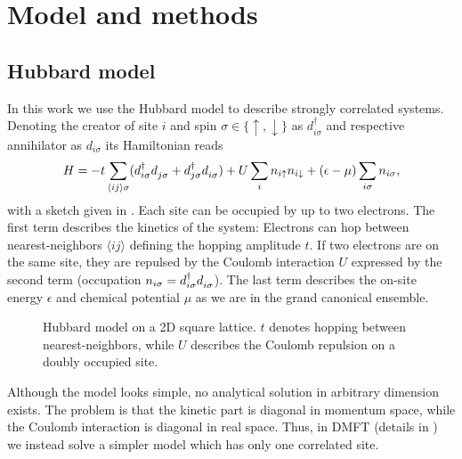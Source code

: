 
\chapter{Model and methods}

\section{Hubbard model}
\label{sec:hubbard-model}

In this work we use the Hubbard model \cite{Hubbard1997} to describe strongly correlated systems.
Denoting the creator of site $i$ and spin $\sigma\in\{\uparrow,\downarrow\}$
as $d^\dag_{i\sigma}$ and respective annihilator as $d_{i\sigma}$ its Hamiltonian reads
\begin{equation}
    H
    =
    -t\sum_{\langle i j\rangle\sigma}
    (d^\dag_{i\sigma} d^{\pdag}_{j\sigma} + d^\dag_{j\sigma} d^{\pdag}_{i\sigma})
    +
    U\sum_i n_{i\uparrow} n_{i\downarrow}
    +
    (\epsilon - \mu)\sum_{i\sigma} n_{i\sigma},
    \label{eq:hubbard}
\end{equation}
with a sketch given in .
Each site can be occupied by up to two electrons.
The first term describes the kinetics of the system:
Electrons can hop between nearest-neighbors $\langle i j\rangle$
defining the hopping amplitude $t$.
If two electrons are on the same site, they are repulsed by the Coulomb interaction $U$
expressed by the second term (occupation $n_{i\sigma} = d^\dag_{i\sigma} d^{\pdag}_{i\sigma}$).
The last term describes the on-site energy $\epsilon$ and
chemical potential $\mu$ as we are in the grand canonical ensemble.

\begin{figure}[ht]
    \centering
    
    \caption{
        Hubbard model on a 2D square lattice.
        $t$ denotes hopping between nearest-neighbors,
        while $U$ describes the Coulomb repulsion on a doubly occupied site.
    }
    \label{fig:hubbard-model}
\end{figure}

Although the model looks simple, no analytical solution in arbitrary dimension exists.
The problem is that the kinetic part is diagonal in momentum space,
while the Coulomb interaction is diagonal in real space.
Thus, in DMFT (details in ) we instead solve a simpler model which has only one correlated site.

